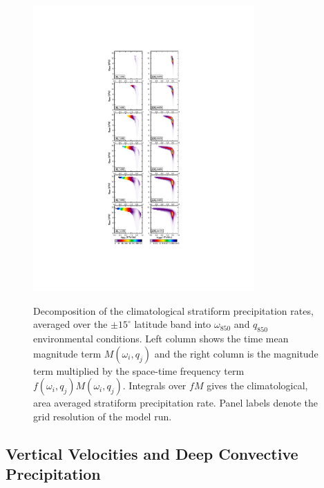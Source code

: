 \documentclass[times]{qjrms4}
\begin{document}
\begin{figure}
\begin{center}
\noindent\includegraphics[width=20pc,angle=0]{figs/temp_pdecomp.pdf}\\
\end{center}
\caption{Decomposition of the climatological stratiform precipitation rates, averaged over the $\pm 15^{\circ}$ latitude band into $\omega_{850}$ and $q_{850}$ environmental conditions. Left column shows the time mean magnitude term $M\left( \omega_i , q_j \right)$ and the right column is the magnitude term multiplied by the space-time frequency term $f\left( \omega_i , q_j \right) M\left( \omega_i , q_j \right)$. Integrals over $f M$ gives the climatological, area averaged stratiform precipitation rate. Panel labels denote the grid resolution of the model run.}
\label{fig:pdecomp}
\end{figure}

\subsection{Vertical Velocities and Deep Convective Precipitation}
\end{document}
